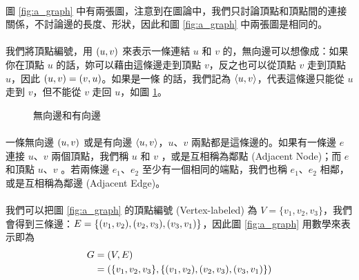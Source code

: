 \documentclass[12pt,a4paper,oneside]{report}
\begin{document}
\begin{CJK}{UTF8}{bkai}
\paragraph{}圖 \ref{fig:a_graph} 中有兩張圖，注意到在圖論中，我們只討論頂點和頂點間的連接關係，不討論邊的長度、形狀，因此和圖 \ref{fig:a_graph} 中兩張圖是相同的。
\paragraph{}我們將頂點編號，用 $({u},{v})$ 來表示一條連結 $u$ 和 $v$ 的\textbf{}，無向邊可以想像成：如果你在頂點 $u$ 的話，妳可以藉由這條邊走到頂點 $v$，反之也可以從頂點 $v$ 走到頂點 $u$，因此 $({u},{v})=({v},{u})$。如果是一條\textbf{} 的話，我們記為 $\langle{}{{u},{v}}\rangle{}$，代表這條邊只能從 $u$ 走到 $v$，但不能從 $v$ 走回 $u$，如圖 \ref{fig:edge_arc}。
\begin{figure}[h!]
\centering
{}
\caption{無向邊和有向邊}
\label{fig:edge_arc}
\end{figure}
\paragraph{}一條無向邊 $({u},{v})$ 或是有向邊 $\langle{}{{u},{v}}\rangle{}$，$u$、$v$ 兩點都是這條邊的\textbf{}。如果有一條邊 $e$ 連接 $u$、$v$ 兩個頂點，我們稱 $u$ 和 $v$ \textbf{}，或是互相稱為鄰點 (Adjacent Node)；而 $e$ 和頂點 $u$、$v$ \textbf{}。若兩條邊 $e_1$、$e_2$ 至少有一個相同的端點，我們也稱 $e_1$、$e_2$ 相鄰，或是互相稱為鄰邊 (Adjacent Edge)。
\paragraph{}我們可以把圖 \ref{fig:a_graph} 的頂點編號 (Vertex-labeled) 為 $V=\{v_1,v_2,v_3\}$，我們會得到三條邊：$E=\{({v_1},{v_2}),({v_2},{v_3}),({v_3},{v_1})\}$，因此圖 \ref{fig:a_graph} 用數學來表示即為
\begin{align*}
G&=(V,E)\\
 &=(\{v_1,v_2,v_3\},\{({v_1},{v_2}),({v_2},{v_3}),({v_3},{v_1})\})
\end{align*}

\end{CJK}
\end{document}
